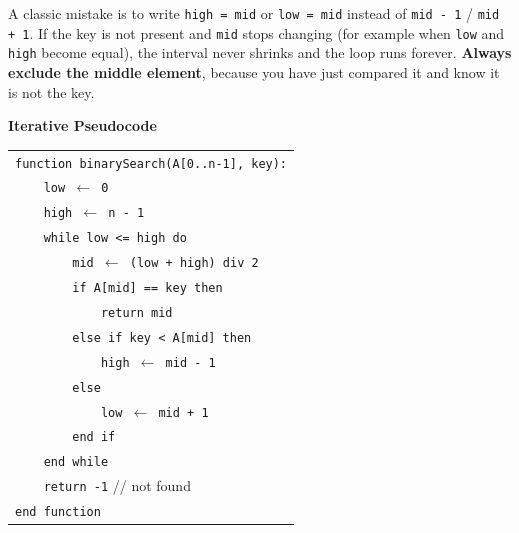 \documentclass[11pt]{article}
\begin{document}
\begin{attention}
A classic mistake is to write \texttt{high = mid} or \texttt{low = mid} instead of \texttt{mid - 1} / \texttt{mid + 1}. If the key is not present and \texttt{mid} stops changing (for example when \texttt{low} and \texttt{high} become equal), the interval never shrinks and the loop runs forever. \textbf{Always exclude the middle element}, because you have just compared it and know it is not the key.
\end{attention}

\textbf{Iterative Pseudocode}
\begin{center}
\begin{tabular}{l}
\hline
\texttt{function binarySearch(A[0..n-1], key):} \\
\texttt{\ \ \ \ low $\leftarrow$ 0} \\
\texttt{\ \ \ \ high $\leftarrow$ n - 1} \\
\texttt{\ \ \ \ while low <= high do} \\
\texttt{\ \ \ \ \ \ \ \ mid $\leftarrow$ (low + high) div 2} \\
\texttt{\ \ \ \ \ \ \ \ if A[mid] == key then} \\
\texttt{\ \ \ \ \ \ \ \ \ \ \ \ return mid} \\
\texttt{\ \ \ \ \ \ \ \ else if key < A[mid] then} \\
\texttt{\ \ \ \ \ \ \ \ \ \ \ \ high $\leftarrow$ mid - 1} \\
\texttt{\ \ \ \ \ \ \ \ else} \\
\texttt{\ \ \ \ \ \ \ \ \ \ \ \ low $\leftarrow$ mid + 1} \\
\texttt{\ \ \ \ \ \ \ \ end if} \\
\texttt{\ \ \ \ end while} \\
\texttt{\ \ \ \ return -1} \quad // not found \\
\texttt{end function} \\
\hline
\end{tabular}
\end{center}
\end{document}
